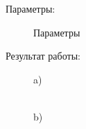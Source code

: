 \documentclass[14pt,a4paper,report]{report}
\begin{document}
\clearpage
Параметры:

\begin{figure}[h!]
\caption{Параметры}
\label{ris:image}
\end{figure}

Результат работы: 

\begin{figure}[h!]
\begin{minipage}[h]{0.47\linewidth}
 a) \\
\end{minipage}
\hfill
\begin{minipage}[h]{0.47\linewidth}
 \\b)

\end{minipage}
\end{figure}
\end{document}
